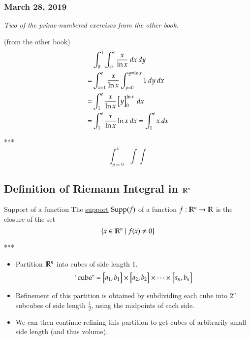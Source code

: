 \subsubsection*{March 28, 2019}
\emph{Two of the prime-numbered exercises from the other book. }

 (from the other book)
\begin{align*}
	&\int_0^1 \int_{e^y}^{e}\frac{x}{\ln x}\ dx\ dy\\
	=&\int_{x=1}^{e}\frac{x}{\ln x} \int_{y=0}^{y=\ln x} 1\ dy\ dx \\
	=&\int_1^e \frac{x}{\ln x} \begin{bmatrix} y \end{bmatrix}_0^{\ln x}\ dx\\
	=&\int_1^e \frac{x}{\ln x}\ln x\ dx = \int_1^e x\ dx
\end{align*}

\begin{center}
\end{center}

 ***
\[\int_{y=0}^4 \int \int\]

\subsection{Definition of Riemann Integral in $\mathbb{R}^n$}

\begin{defn}{Support of a function}
	The \ul{support} $\mathrm{Supp}(f)$ of a function $f : \mathbb{R}^n \to \mathbb{R}$ is the closure of the set
	\begin{equation}
		\left\{ x\in\mathbb{R}^n \mid f(x)\neq 0 \right\}
	\end{equation}
\end{defn}

***

\begin{itemize}
	\item Partition $\mathbb{R}^n$ into cubes of side length 1. 	\[ \text{"cube"} = \begin{bmatrix} a_1, b_1 \end{bmatrix} \times \begin{bmatrix} a_2, b_2 \end{bmatrix} \times \cdots \times \begin{bmatrix} a_n, b_n \end{bmatrix}\]
	
	\item Refinement of this partition is obtained by subdividing each cube into $2^n$ subcubes of side length $\frac{1}{2}$, using the midpoints of each side. 
	\item We can then continue refining this partition to get cubes of arbitrarily small side length (and thus volume). 
\end{itemize}

